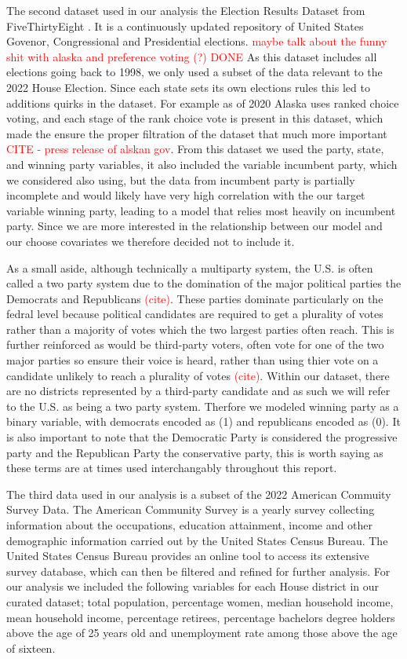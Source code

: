 \documentclass[12pt]{article}
\newcommand{\red}[1]{\textcolor{red}{#1}}
\begin{document}
The second dataset used in our analysis the Election Results Dataset from FiveThirtyEight \cite{electionresultsdataset}. It is a continuously updated repository of United States Govenor, Congressional and Presidential elections.  \red{maybe talk about the funny shit with alaska and preference voting (?) DONE}
As this dataset includes all elections going back to 1998, we only used a subset of the data relevant to the 2022 House Election. Since each state sets its own elections rules this led to additions quirks in the dataset. For example as of 2020 Alaska uses ranked choice voting, and each stage of the rank choice vote is present in this dataset, which made the ensure the proper filtration of the dataset that much more important \red{CITE - press release of alskan gov}. From this dataset we used the party, state, and winning party variables, it also included the variable incumbent party, which we considered also using, but the data from incumbent party is partially incomplete and would likely have very high correlation with the our target variable winning party, leading to a model that relies most heavily on incumbent party. Since we are more interested in the relationship between our model and our choose covariates we therefore decided not to include it.  

As a small aside, although technically a multiparty system, the U.S. is often called a two party system due to the domination of the major political parties the Democrats and Republicans \textcolor{red}{(cite)}. These parties dominate particularly on the fedral level because political candidates are required to get a plurality of votes rather than a majority of votes which the two largest parties often reach. This is further reinforced as would be third-party voters, often vote for one of the two major parties so ensure their voice is heard, rather than using thier vote on a candidate unlikely to reach a plurality of votes \textcolor{red}{(cite)}. Within our dataset, there are no districts represented by a third-party candidate and as such we will refer to the U.S. as being a two party system. Therfore we modeled winning party as a binary variable, with democrats encoded as (1) and republicans encoded as (0). It is also important to note that the Democratic Party is considered the progressive party and the Republican Party the conservative party, this is worth saying as 
these terms are at times used interchangably throughout this report. 

The third data used in our analysis is a subset of the 2022 American Commuity Survey Data. The American Community Survey is a yearly survey collecting information about the occupations, education attainment, income and other demographic information carried out by the United States Census Bureau. The United States Census Bureau provides an online tool to access its extensive survey database, which can then be filtered and refined for further analysis. For our analysis we included the following variables for each House district in our curated dataset; total population, percentage women, median household income, mean household income, percentage retirees, percentage bachelors degree holders above the age of 25 years old and unemployment rate among those above the age of sixteen. 
\end{document}
